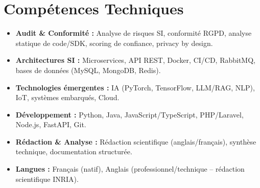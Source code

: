 \documentclass[a4paper,11pt]{article}
\begin{document}
\section{Compétences Techniques}
\begin{itemize}[leftmargin=*, nosep]
    \item \small{\textbf{Audit \& Conformité :} Analyse de risques SI, conformité RGPD, analyse statique de code/SDK, scoring de confiance, privacy by design.}
    \item \small{\textbf{Architectures SI :} Microservices, API REST, Docker, CI/CD, RabbitMQ, bases de données (MySQL, MongoDB, Redis).}
    \item \small{\textbf{Technologies émergentes :} IA (PyTorch, TensorFlow, LLM/RAG, NLP), IoT, systèmes embarqués, Cloud.}
    \item \small{\textbf{Développement :} Python, Java, JavaScript/TypeScript, PHP/Laravel, Node.js, FastAPI, Git.}
    \item \small{\textbf{Rédaction \& Analyse :} Rédaction scientifique (anglais/français), synthèse technique, documentation structurée.}
    \item \small{\textbf{Langues :} Français (natif), Anglais (professionnel/technique -- rédaction scientifique INRIA).}
\end{itemize}

\end{document}
